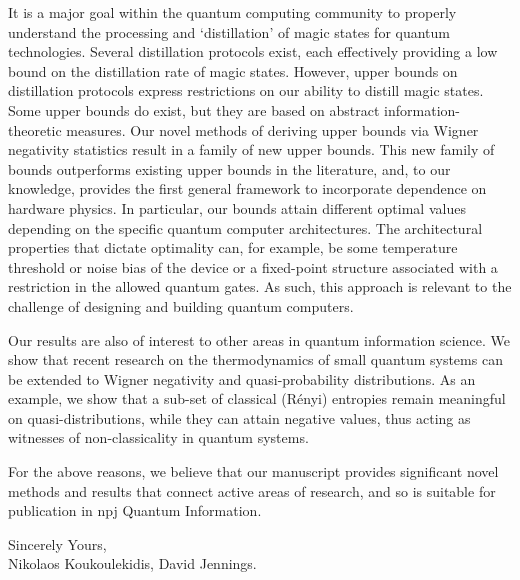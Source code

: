 \documentclass[11pt]{letter}
\begin{document}
It is a major goal within the quantum computing community to properly understand the processing and `distillation' of magic states for quantum technologies. Several distillation protocols exist, each effectively providing a low bound on the distillation rate of magic states. However, upper bounds on distillation protocols express restrictions on our ability to distill magic states. Some upper bounds do exist, but they are based on abstract information-theoretic measures. Our novel methods of deriving upper bounds via Wigner negativity statistics result in a family of new upper bounds. This new family of bounds outperforms existing upper bounds in the literature, and, to our knowledge, provides the first general framework to incorporate dependence on hardware physics. In particular, our bounds attain different optimal values depending on the specific quantum computer architectures. The architectural properties that dictate optimality can, for example, be some temperature threshold or noise bias of the device or a fixed-point structure associated with a restriction in the allowed quantum gates.  As such, this approach is relevant to the challenge of designing and building quantum computers.


Our results are also of interest to other areas in quantum information science. We show that recent research on the thermodynamics of small quantum systems can be extended to Wigner negativity and quasi-probability distributions. As an example, we show that a sub-set of classical (R\'{e}nyi) entropies remain meaningful on quasi-distributions, while they can attain negative values, thus acting as witnesses of non-classicality in quantum systems.

For the above reasons, we believe that our manuscript provides significant novel methods and results that connect active areas of research, and so is suitable for publication in npj Quantum Information.

\vspace{1cm}
\hspace{8cm}
\begin{minipage}{9cm}
\flushleft
Sincerely Yours,\\

Nikolaos Koukoulekidis, David Jennings.
\end{minipage}
\end{document}
